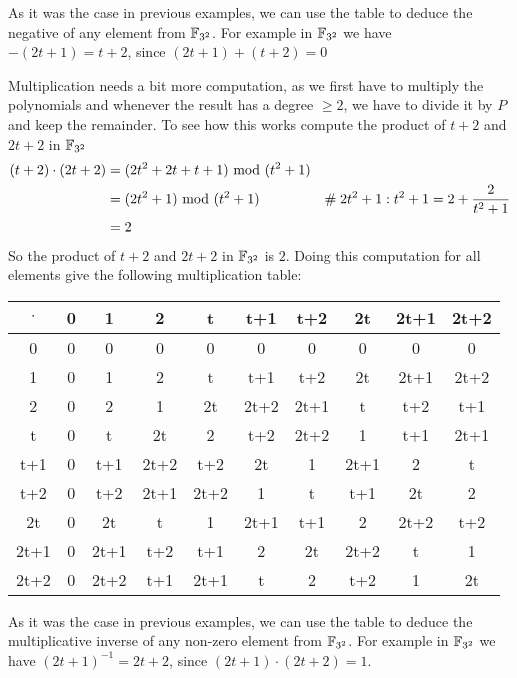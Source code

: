 \begin{example}
As it was the case in previous examples, we can use the table to deduce the negative of any element from $\mathbb{F}_{3^2}$. For example in $\mathbb{F}_{3^2}$ we have $-(2t+1)= t+2$, since $(2t+1) + (t+2)=0$

Multiplication needs a bit more computation, as we first have to multiply the polynomials and whenever the result has a degree $\geq 2$, we have to divide it by $P$ and keep the remainder. To see how this works compute the product of $t+2$ and $2t+2$ in $\mathbb{F}_{3^2}$
\begin{align*}
(t+2) \cdot (2t+2) &= (2t^2 + 2t + t + 1) \text{ mod } (t^2+1) \\
                   &= (2t^2+1) \text{ mod } (t^2+1) & \#\; 2t^2+1:t^2+1= 2 + \frac{2}{t^2+1} \\
                   &= 2
\end{align*}
So the product of $t+2$ and $2t+2$ in $\mathbb{F}_{3^2}$ is $2$. Doing this computation for all elements give the following multiplication table:
\begin{center}
  \begin{tabular}{c | c c c c c c c c c}
$\cdot$ & 0    & 1    & 2    & t    & t+1  & t+2  & 2t   & 2t+1 & 2t+2 \\\hline
      0 & 0    & 0    & 0    & 0    & 0    & 0    & 0    & 0    & 0 \\
      1 & 0    & 1    & 2    & t    & t+1  & t+2  & 2t   & 2t+1 & 2t+2\\
      2 & 0    & 2    & 1    & 2t   & 2t+2 & 2t+1 & t    & t+2  & t+1 \\
      t & 0    & t    & 2t   & 2    & t+2  & 2t+2 & 1    & t+1  & 2t+1  \\
    t+1 & 0    & t+1  & 2t+2 & t+2  & 2t   & 1    & 2t+1 & 2    & t   \\
    t+2 & 0    & t+2  & 2t+1 & 2t+2 & 1    & t    & t+1  & 2t   & 2    \\
     2t & 0    & 2t   & t    & 1    & 2t+1 & t+1  & 2  & 2t+2 & t+2\\
   2t+1 & 0    & 2t+1 & t+2  & t+1  & 2    & 2t   & 2t+2 & t    & 1    \\
   2t+2 & 0    & 2t+2 & t+1  & 2t+1 & t    & 2    & t+2  & 1     & 2t
  \end{tabular}
\end{center}
As it was the case in previous examples, we can use the table to deduce the multiplicative inverse of any non-zero element from $\mathbb{F}_{3^2}$. For example in $\mathbb{F}_{3^2}$ we have $(2t+1)^{-1}= 2t+2 $, since $(2t+1) \cdot (2t+2)=1$.


\end{example}
